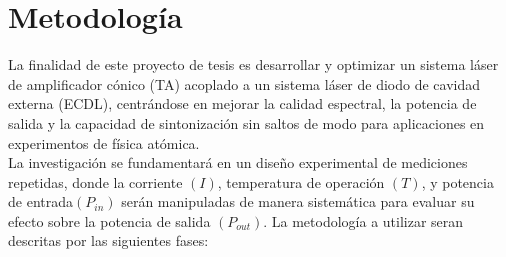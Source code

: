 \documentclass[12pt]{article}
\begin{document}
\section{Metodología}
La finalidad de este proyecto de tesis es desarrollar y optimizar un sistema láser de amplificador cónico (TA) acoplado a un sistema láser de diodo de cavidad externa (ECDL), centrándose en mejorar la calidad espectral, la potencia de salida y la capacidad de sintonización sin saltos de modo para aplicaciones en experimentos de física atómica.
\\ \newline
La investigación se fundamentará en un diseño experimental de mediciones repetidas, donde la corriente $(I)$, temperatura de operación $(T)$, y potencia de entrada$(P_{in})$ serán manipuladas de manera sistemática para evaluar su efecto sobre la potencia de salida $(P_{out})$. La metodología a utilizar seran descritas por las siguientes fases:
\end{document}
